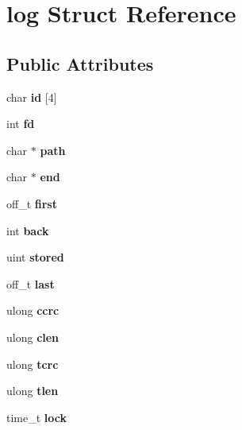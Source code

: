 \hypertarget{structlog}{}\section{log Struct Reference}
\label{structlog}
\subsection*{Public Attributes}
\begin{DoxyCompactItemize}
\item 
\mbox{\label{structlog_a60df0f7572e5686bac49c79bd33d32d9}} 
char {\bfseries id} \mbox{[}4\mbox{]}
\item 
\mbox{\label{structlog_aac6e90068f890c8b97924668e0f6d48f}} 
int {\bfseries fd}
\item 
\mbox{\label{structlog_ae606be23e330731749d7aa95daaddb7a}} 
char $\ast$ {\bfseries path}
\item 
\mbox{\label{structlog_a3585b021d13151c372e2ed6dbdb009f9}} 
char $\ast$ {\bfseries end}
\item 
\mbox{\label{structlog_a8a8da4d613191483ee0d9c145bc2c9aa}} 
off\+\_\+t {\bfseries first}
\item 
\mbox{\label{structlog_a31363cd250394e9b0a66b8b8be230024}} 
int {\bfseries back}
\item 
\mbox{\label{structlog_a213ed17ff665cbbcc29d811c1b870cec}} 
uint {\bfseries stored}
\item 
\mbox{\label{structlog_a8fa8a4611c57d15e286080602b38fa7a}} 
off\+\_\+t {\bfseries last}
\item 
\mbox{\label{structlog_a59b7aeffac2c4fc8ca125be47ed272a7}} 
ulong {\bfseries ccrc}
\item 
\mbox{\label{structlog_acad050aa5fd8c766cc84f161ebdb6806}} 
ulong {\bfseries clen}
\item 
\mbox{\label{structlog_a79b1a158eeaf71d677243734dd475b8b}} 
ulong {\bfseries tcrc}
\item 
\mbox{\label{structlog_a325d0cd98283f2a8012cf6f4bf3f2b34}} 
ulong {\bfseries tlen}
\item 
\mbox{\label{structlog_a1db7776984d5005f5814ccfe47f2b1fd}} 
time\+\_\+t {\bfseries lock}
\end{DoxyCompactItemize}



